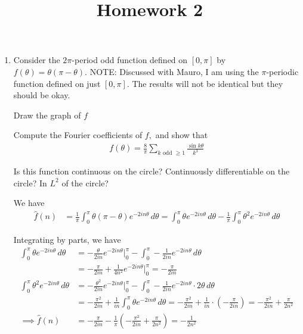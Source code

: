 \documentclass{article}
\begin{document}
\title{Homework 2}
\maketitle
\thispagestyle{fancy}

\begin{enumerate}
	\item Consider the $2\pi$-period odd function defined on $[0, \pi]$ by $f(\theta)=\theta(\pi-\theta).$ NOTE: Discussed with Mauro, I am using the $\pi$-periodic function defined on just $[0, \pi].$ The results will not be identical but they should be okay.
		
		\begin{enumerate}[(a)]
			\ii Draw the graph of $f$

			\ii Compute the Fourier coefficients of $f,$ and show that
			\begin{align*}
				f(\theta)=\frac{8}{\pi} \sum_{k\text{ odd }\ge1}^{} \frac{\sin k\theta}{k^3}
			\end{align*}

			Is this function continuous on the circle? Continuously differentiable on the circle? In $L^2$ of the circle?
			\begin{soln}
				We have
				\begin{align*}
					\hat f(n) &= \frac{1}{\pi} \int_0^\pi \theta(\pi-\theta) e^{-2in\theta}\, d\theta = \int_0^\pi \theta e^{-2in\theta}\, d\theta - \frac{1}{\pi}\int_0^\pi \theta^2 e^{-2in\theta}\, d\theta
				\end{align*}

				Integrating by parts, we have
				\begin{align*}
					\int_0^\pi \theta e^{-2in\theta}\, d\theta &= -\frac{\theta}{2in} e^{-2in\theta}\bigg\vert_0^\pi - \int_0^\pi -\frac{1}{2in} e^{-2in\theta}\, d\theta \\
					&= -\frac{\pi}{2in} + \frac{1}{4n^2}e^{-2in\theta}\bigg\vert_0^\pi = -\frac{\pi}{2in} \\
					\int_0^\pi \theta^2 e^{-2in\theta}\, d\theta &= -\frac{\theta^2}{2in}e^{-2in\theta}\bigg\vert_0^\pi - \int_0^\pi -\frac{1}{2in}e^{-2in\theta}\cdot 2\theta\, d\theta \\
					&= -\frac{\pi^2}{2in} + \frac{1}{in}\int_0^\pi \theta e^{-2in\theta}\, d\theta = -\frac{\pi^2}{2in} + \frac{1}{in} \cdot \left( -\frac{\pi}{2in} \right) = -\frac{\pi^2}{2in} + \frac{\pi}{2n^2} \\
					\implies \hat f(n) &= -\frac{\pi}{2in} - \frac{1}{\pi}\left( -\frac{\pi^2}{2in} + \frac{\pi}{2n^2} \right) = -\frac{1}{2n^2}
				\end{align*}


\end{soln}
\end{enumerate}
\end{enumerate}
\end{document}
